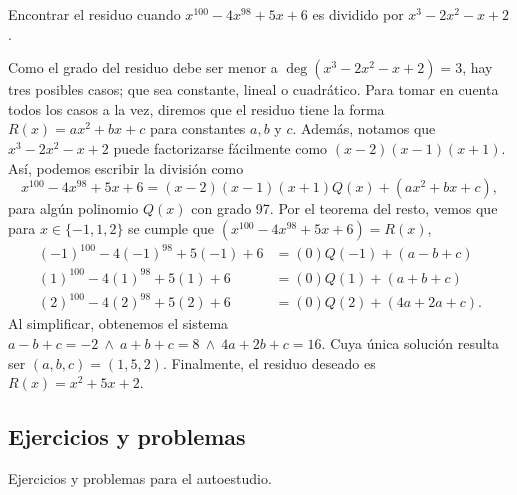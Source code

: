 \begin{example}
    Encontrar el residuo cuando $x^{100} - 4x^{98} + 5x + 6$ es dividido por $x^3 - 2x^2 - x + 2$.
\end{example}
\begin{solution}
    Como el grado del residuo debe ser menor a $\deg{(x^3 - 2x^2 - x + 2)} = 3$, hay tres posibles casos;
    que sea constante, lineal o cuadrático.
    Para tomar en cuenta todos los casos a la vez, diremos que el residuo tiene la forma $R(x) = ax^2 + bx + c$ para constantes $a, b$ y $c$.
    Además, notamos que $x^3 - 2x^2 - x + 2$ puede factorizarse fácilmente como $(x - 2)(x - 1)(x + 1)$.
    Así, podemos escribir la división como
    \[
        x^{100} - 4x^{98} + 5x + 6 = (x - 2)(x - 1)(x + 1)Q(x) + (ax^2 + bx + c),
    \]
    para algún polinomio $Q(x)$ con grado 97.
    Por el teorema del resto, vemos que para $x \in \{-1, 1, 2\}$ se cumple que $\left(x^{100} - 4x^{98} + 5x + 6\right) = R(x)$, \ie
    \begin{align*}
        (-1)^{100} - 4(-1)^{98} + 5(-1) + 6 &= (0)Q(-1) + (a - b + c)\\
        (1)^{100} - 4(1)^{98} + 5(1) + 6 &= (0)Q(1) + (a + b + c)\\
        (2)^{100} - 4(2)^{98} + 5(2) + 6 &= (0)Q(2) + (4a + 2a + c).
    \end{align*}
    Al simplificar, obtenemos el sistema $a - b + c = -2\ \land\ a +  b + c = 8\ \land\ 4a + 2b +  c = 16$.
    Cuya única solución resulta ser $(a, b, c) = (1, 5, 2)$.
    Finalmente, el residuo deseado es $\boxed{R(x) = x^2 + 5x + 2}$.
\end{solution}



\subsection{Ejercicios y problemas}

Ejercicios y problemas para el autoestudio.


